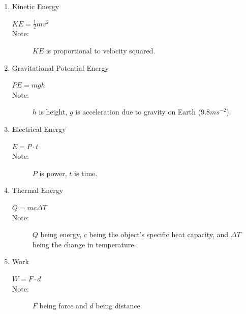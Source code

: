 \documentclass{article}
\begin{document}
                \begin{table}[H]
                    \caption{}\label{tab:1}
                    \begin{enumerate}
                        \item Kinetic Energy
                            \begin{description}
                                \item[$KE =\tfrac{1}{2}mv^2$] 
                                \item[Note:]$KE$ is proportional to velocity squared.
                            \end{description}
                        \item Gravitational Potential Energy
                            \begin{description}
                                \item[$PE = mgh$]
                                \item[Note:] $h$ is height, $g$ is acceleration due to gravity on Earth ($9.8 ms^{-2}$).
                            \end{description}
                        \item Electrical Energy
                            \begin{description}
                                \item[$E = P \cdot t$]
                                \item[Note:] $P$ is power, $t$ is time. 
                            \end{description}
                        \item Thermal Energy
                            \begin{description}
                                \item[$Q = mc\Delta T$]
                                \item[Note:] $Q$ being energy, $c$ being the object's specific heat capacity, and $\Delta T$ being the change in temperature. 
                            \end{description}
                        \item Work
                            \begin{description}
                                \item[$W = F\cdot d$]
                                \item[Note:]$F$ being force and $d$ being distance.  
                            \end{description}
                    \end{enumerate}

                \end{table}
\end{document}

